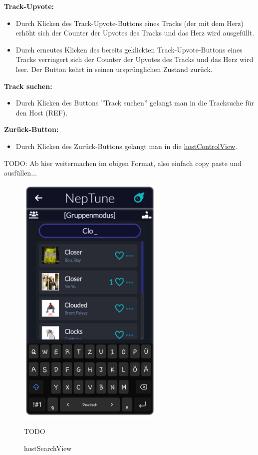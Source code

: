 \documentclass[oneside, ngerman]{sdqtechreport}
\begin{document}
\textbf{Track-Upvote:}
\begin{itemize}
    \item Durch Klicken des Track-Upvote-Buttons eines Tracks (der mit dem Herz) erhöht sich der Counter der Upvotes des Tracks und das Herz wird ausgefüllt.
    \item Durch erneutes Klicken des bereits geklickten Track-Upvote-Buttons eines Tracks verringert sich der Counter der Upvotes des Tracks und das Herz wird leer. Der Button kehrt in seinen ursprünglichen Zustand zurück.
\end{itemize}

\textbf{Track suchen:}
\begin{itemize}
    \item Durch Klicken des Buttons ''Track suchen'' gelangt man in die Tracksuche für den Host (REF).
\end{itemize}

\textbf{Zurück-Button:}
\begin{itemize}
    \item Durch Klicken des Zurück-Buttons gelangt man in die  \hyperlink{hostControlView}{hostControlView}.
\end{itemize}

\newpage

TODO: Ab hier weitermachen im obigen Format, also einfach copy paste und ausfüllen...

\begin{figure}
    \hypertarget{hostSearchView}{}
    \begin{minipage}[t]{7 cm}
        \vspace{-1.5ex}
        \includegraphics[width=7cm]{LATEX/Pflichtenheft/GraphicDesigns/hostSearchPage.png}
        \caption{hostSearchView}
    \end{minipage}
    \hspace{1cm}
    \begin{minipage}[t]{7 cm}
        \vspace{1cm}
        TODO
    \end{minipage}
\end{figure}
\end{document}
